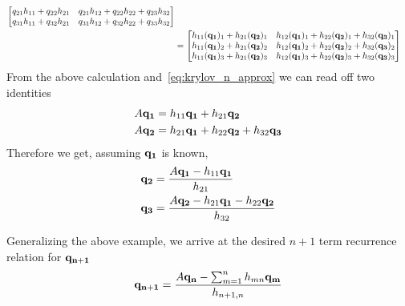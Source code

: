 \begin{example}
\begin{align*}
\begin{bmatrix}
				q_{21}h_{11} + q_{22}h_{21} & q_{21}h_{12} + q_{22}h_{22} + q_{23}h_{32}\\
				q_{31}h_{11} + q_{32}h_{21} & q_{31}h_{12} + q_{32}h_{22}+ q_{33}h_{32}
			\end{bmatrix}\\		
			&=
			\begin{bmatrix}
				h_{11}(\vectorbold{q_1})_1 + h_{21}(\vectorbold{q_2})_1 & h_{12}(\vectorbold{q_1})_1 + h_{22}(\vectorbold{q_2})_1 + h_{32}(\vectorbold{q_3})_1 \\
				h_{11}(\vectorbold{q_1})_2 + h_{21}(\vectorbold{q_2})_2 & h_{12}(\vectorbold{q_1})_2 + h_{22}(\vectorbold{q_2})_2 + h_{32}(\vectorbold{q_3})_2 \\
				h_{11}(\vectorbold{q_1})_3 + h_{21}(\vectorbold{q_2})_3 & h_{12}(\vectorbold{q_1})_3 + h_{22}(\vectorbold{q_2})_3 + h_{32}(\vectorbold{q_3})_3
			\end{bmatrix}
	\end{align*}
	From the above calculation and~\ref{eq:krylov_n_approx} we can read off two identities
	\begin{align*}
		A\vectorbold{q_1} &= h_{11}\vectorbold{q_1}+h_{21}\vectorbold{q_2}\\
		A\vectorbold{q_2} &= h_{21}\vectorbold{q_1}+h_{22}\vectorbold{q_2} + h_{32}\vectorbold{q_3}
	\end{align*}
	Therefore we get, assuming \(\vectorbold{q_1}\) is known,
	\begin{align*}
		\vectorbold{q_2} &= \frac{A \vectorbold{q_1} - h_{11} \vectorbold{q_1}}{h_{21}}\\
		\vectorbold{q_3} &= \frac{A \vectorbold{q_2} - h_{21} \vectorbold{q_1} - h_{22}\vectorbold{q_2}}{h_{32}}
	\end{align*}
\end{example}
Generalizing the above example, we arrive at the desired \(n+1\) term recurrence relation for \(\vectorbold{q_{n+1}}\)
\begin{equation}
	\vectorbold{q_{n+1}} = \frac{A \vectorbold{q_n} - \sum_{m=1}^{n} h_{mn}\vectorbold{q_m}}{h_{n+1,n}}
	\label{eq:arnoldi_recurrence}
\end{equation}

